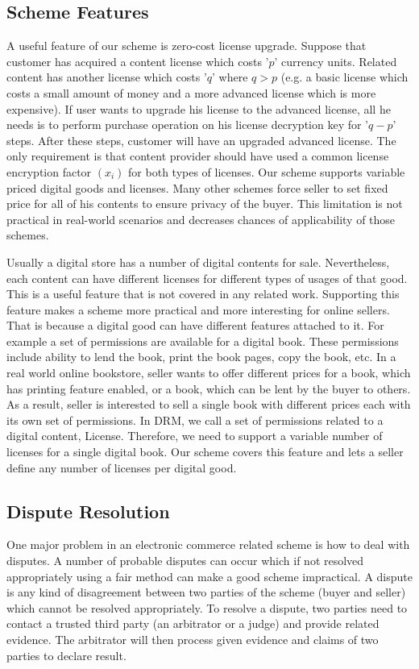 \documentclass[times]{secauth}
\begin{document}
\subsection{Scheme Features}
\label{sec:useful_features}
A useful feature of our scheme is zero-cost license upgrade. Suppose that customer has acquired a content license which costs '$p$' currency units. Related content has another license which costs '$q$' where $q>p$ (e.g. a basic license which costs a small amount of money and a more advanced license which is more expensive). If user wants to upgrade his license to the advanced license, all he needs is to perform purchase operation on his license decryption key for '$q-p$' steps. After these steps, customer will have an upgraded advanced license. The only requirement is that content provider should have used a common license encryption factor $(x_i)$ for both types of licenses.
Our scheme supports variable priced digital goods and licenses. Many other schemes force seller to set fixed price for all of his contents to ensure privacy of the buyer. This limitation is not practical in real-world scenarios and decreases chances of applicability of those schemes.

Usually a digital store has a number of digital contents for sale. Nevertheless, each content  can have different licenses for different types of usages of that good. This is a useful feature that is not covered in any related work. Supporting this feature makes a scheme more practical and more interesting for online sellers. That is because a digital good can have different features attached to it. For example a set of permissions are available for a digital book. These permissions include ability to lend the book, print the book pages, copy the book, etc. In a real world online bookstore, seller wants to offer different prices for a book, which has printing feature enabled, or a book, which can be lent by the buyer to others. As a result, seller is interested to sell a single book with different prices each with its own set of permissions. In DRM, we call a set of permissions related to a digital content, License. Therefore, we need to support a variable number of licenses for a single digital book. Our scheme covers this feature and lets a seller define any number of licenses per digital good.

\subsection{Dispute Resolution}
\label{sec:dispute}
One major problem in an electronic commerce related scheme is how to deal with disputes. A number of probable disputes can occur which if not resolved appropriately using a fair method can make a good scheme impractical. A dispute is any kind of disagreement between two parties of the scheme (buyer and seller) which cannot be resolved appropriately. To resolve a dispute, two parties need to contact a trusted third party (an arbitrator or a judge) and provide related evidence. The arbitrator will then process given evidence and claims of two parties to declare result. 
\end{document}
